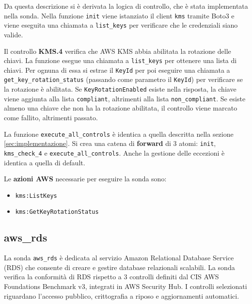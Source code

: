 Da questa descrizione si è derivata la logica di controllo, che è stata implementata nella sonda. Nella funzione \texttt{init} viene istanziato il client \texttt{kms} tramite Boto3 e viene eseguita una chiamata a \texttt{list\_keys} per verificare che le credenziali siano valide.

Il controllo \textbf{KMS.4} verifica che AWS KMS abbia abilitata la rotazione delle chiavi. La funzione esegue una chiamata a \texttt{list\_keys} per ottenere una lista di chiavi. Per ognuna di essa si estrae il \texttt{KeyId} per poi eseguire una chiamata a \texttt{get\_key\_rotation\_status} (passando come parametro il \texttt{KeyId}) per verificare se la rotazione è abilitata. Se \texttt{KeyRotationEnabled} esiste nella risposta, la chiave viene aggiunta alla lista \texttt{compliant}, altrimenti alla lista \texttt{non\_compliant}. Se esiste almeno una chiave che non ha la rotazione abilitata, il controllo viene marcato come fallito, altrimenti passato.

La funzione \texttt{execute\_all\_controls} è identica a quella descritta nella sezione \ref{sec:implementazione}. Si crea una catena di \textbf{forward} di 3 atomi: \texttt{init}, \texttt{kms\_check\_4} e \texttt{execute\_all\_controls}. Anche la gestione delle eccezioni è identica a quella di default.

\vspace{1em}

\noindent Le \textbf{azioni AWS} necessarie per eseguire la sonda sono:
\begin{itemize}
    \item \texttt{kms:ListKeys}
    \item \texttt{kms:GetKeyRotationStatus}
\end{itemize}

\subsection{aws\_rds}
\label{sec:rds}

La sonda \texttt{aws\_rds} è dedicata al servizio Amazon Relational Database Service (RDS) che consente di creare e gestire database relazionali scalabili. La sonda verifica la conformità di RDS rispetto a 3  controlli definiti dal CIS AWS Foundations Benchmark v3, integrati in AWS Security Hub. I controlli selezionati riguardano l'accesso pubblico, crittografia a riposo e aggiornamenti automatici.

